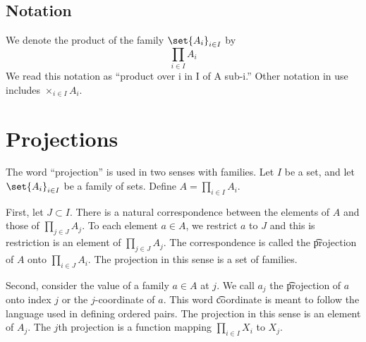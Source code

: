 \subsection*{Notation}

We denote the product of the family $\set{A_i}_{i \in I}$ by
\[
\textstyle
\prod_{i \in I} A_i
\]
We read this notation as ``product over i in I of A sub-i.''
Other notation in use includes $\times _{i \in I} A_i$.


\section*{Projections}

The word ``projection'' is used in two senses with families.
Let $I$ be a set, and let $\set{A_i}_{i \in I}$ be a family of sets.
Define $A = \prod_{i \in I} A_i$.

First, let $J \subset I$.
There is a natural correspondence between the elements of $A$ and those of $\prod_{j \in J} A_j$.
To each element $a \in A$, we restrict $a$ to $J$ and this is restriction is an element of $\prod_{j \in J} A_j$.
The correspondence is called the \t{projection} of $A$ onto $\prod_{i \in J} A_i$.
The projection in this sense is a set of families.

Second, consider the value of a family $a \in A$ at $j$.
We call $a_j$ the \t{projection of $a$ onto index $j$} or the \t{$j$-coordinate} of $a$.
This word \t{coordinate} is meant to follow the language used in defining ordered pairs.
The projection in this sense is an element of $A_j$.
The $j$th projection is a function mapping $\prod_{i \in I} X_i$ to $X_j$.
